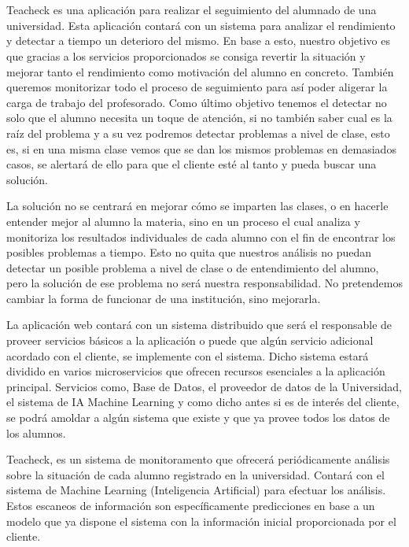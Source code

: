 \chapter{\introduccion}

\paragraph{}
Teacheck es una aplicación para realizar el seguimiento del alumnado de una universidad.
Esta aplicación contará con un sistema para analizar el rendimiento y detectar a tiempo un deterioro del mismo. En base a esto, nuestro objetivo es que gracias a los servicios proporcionados se consiga revertir la situación y mejorar tanto el rendimiento como motivación del alumno en concreto. También queremos monitorizar todo el proceso de seguimiento para así poder aligerar la carga de trabajo del profesorado. Como último objetivo tenemos el detectar no solo que el alumno necesita un toque de atención, si no también saber cual es la raíz del problema y a su vez podremos detectar problemas a nivel de clase, esto es, si en una misma clase vemos que se dan los mismos problemas en demasiados casos, se alertará de ello para que el cliente esté al tanto y pueda buscar una solución.

La solución no se centrará en mejorar cómo se imparten las clases, o en hacerle entender mejor al alumno la materia, sino en un proceso el cual analiza y monitoriza los resultados individuales de cada alumno con el fin de encontrar los posibles problemas a tiempo. Esto no quita que nuestros análisis no puedan detectar un posible problema a nivel de clase o de entendimiento del alumno, pero la solución de ese problema no será nuestra responsabilidad. No pretendemos cambiar la forma de funcionar de una institución, sino mejorarla.

La aplicación web contará con un sistema distribuido que será el responsable de proveer servicios básicos a la aplicación o puede que algún servicio adicional acordado con el cliente, se implemente con el sistema. Dicho sistema estará dividido en varios microservicios que ofrecen recursos esenciales a la aplicación principal. Servicios como, Base de Datos, el proveedor de datos de la Universidad, el sistema de IA Machine Learning y como dicho antes si es de interés del cliente, se podrá amoldar a algún sistema que existe y que ya provee todos los datos de los alumnos.

Teacheck, es un sistema de monitoramento que ofrecerá periódicamente análisis sobre la situación de cada alumno registrado en la universidad. Contará con el sistema de Machine Learning (Inteligencia Artificial)  para efectuar los análisis. Estos escaneos de información son específicamente predicciones en base a un modelo que ya dispone el sistema con la información inicial proporcionada por el cliente.


